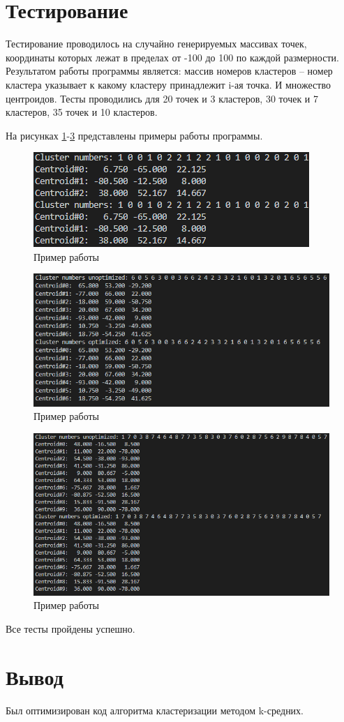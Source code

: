 \section{Тестирование}
\label{sec:tests}
Тестирование проводилось на случайно генерируемых массивах точек, координаты которых лежат в пределах от -100 до 100 по каждой размерности. Результатом работы программы является: массив номеров кластеров -- номер кластера указывает к какому кластеру принадлежит i-ая точка. И множество центроидов. Тесты проводились для 20 точек и 3 кластеров, 30 точек и 7 кластеров, 35 точек и 10 кластеров. 
\par На рисунках \ref{fig:screenshot001}-\ref{fig:screenshot003} представлены примеры работы программы.
\begin{figure}[H]
	\centering
	\includegraphics[width=0.5\linewidth]{src/screenshot001}
	\caption{Пример работы}
	\label{fig:screenshot001}
\end{figure}
\begin{figure}[H]
	\centering
	\includegraphics[width=0.5\linewidth]{src/screenshot002}
	\caption{Пример работы}
	\label{fig:screenshot002}
\end{figure}
\begin{figure}[H]
	\centering
	\includegraphics[width=0.7\linewidth]{src/screenshot003}
	\caption{Пример работы}
	\label{fig:screenshot003}
\end{figure}
Все тесты пройдены успешно.



\section{Вывод}
\label{sec:res}
Был оптимизирован код алгоритма кластеризации методом k-средних. 
